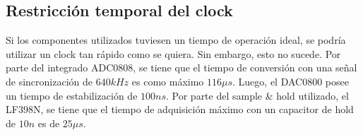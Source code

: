 \subsection{Restricción temporal del clock}

Si los componentes utilizados tuviesen un tiempo de operación ideal, se podría utilizar un clock tan rápido como se quiera. Sin embargo, esto no sucede. Por parte del integrado ADC0808, se tiene que el tiempo de conversión con una señal de sincronización de $640kHz$ es como máximo $116\mu s$. Luego, el DAC0800 posee un tiempo de estabilización de $100ns$. Por parte del sample \& hold utilizado, el LF398N, se tiene que el tiempo de adquisición máximo con un capacitor de hold de $10n$ es de $25\mu s$.

